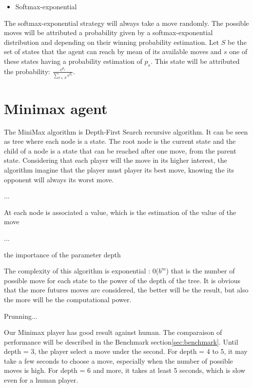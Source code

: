 \documentclass{article}
\newcommand\ddfrac[2]{\frac{\displaystyle #1}{\displaystyle #2}}
\begin{document}
\begin{itemize}
    \item Softmax-exponential
\end{itemize}

The softmax-exponential strategy will always take a move randomly. The possible moves will be attributed a probability given by a softmax-exponential distribution and depending on their winning probability estimation. Let $S$ be the set of states that the agent can reach by mean of its available moves and $s$ one of these states having a probability estimation of $p_{s}$. This state will be attributed the probability: $\ddfrac{e^{p_{s}}}{\sum_{t \in S}{e^{p_{t}}}}$.

\section{Minimax agent}
The MiniMax algorithm is Depth-First Search recursive algorithm. It can be seen as tree where each node is a state.
The root node is the current state and the child of a node is a state that can be reached after one move, from the parent state.
Considering that each player will the move in its higher interest, the algorithm imagine that the player must player its best move, knowing the its opponent will always its worst move.

...

At each node is associated a value, which is the estimation of the value of the move

...

the importance of the parameter depth

The complexity of this algorithm is exponential : 0($b^m$) that is the number of possible move for each state to the power of the depth of the tree.
It is obvious that the more futures moves are considered, the better will be the result, but also the more will be the computational power.

Prunning...

Our Minimax player has good result against human. The comparaison of performance will be described in the Benchmark section\ref{sec:benchmark}.
Until depth = 3, the player select a move under the second.
For depth = 4 to 5, it may take a few seconds to choose a move, especially when the number of possible moves is high.
For depth = 6 and more, it takes at least 5 seconds, which is slow even for a human player.
\end{document}
